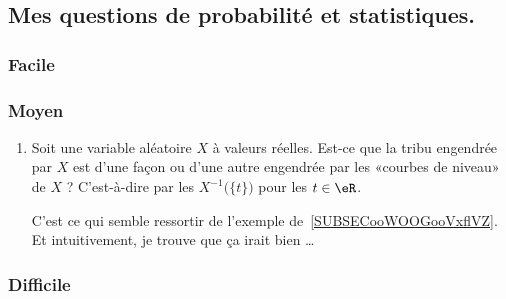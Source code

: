 \subsection{Mes questions de probabilité et statistiques.}

\subsubsection{Facile}

\subsubsection{Moyen}

\begin{enumerate}
    \item
        Soit une variable aléatoire \( X\) à valeurs réelles. Est-ce que la tribu engendrée par \( X\) est d'une façon ou d'une autre engendrée par les «courbes de niveau» de \( X\) ? C'est-à-dire par les \( X^{-1}\big( \{ t \} \big)\) pour les \( t\in \eR\).

        C'est ce qui semble ressortir de l'exemple de~\ref{SUBSECooWOOGooVxflVZ}. Et intuitivement, je trouve que ça irait bien \ldots
\end{enumerate}


\subsubsection{Difficile}

